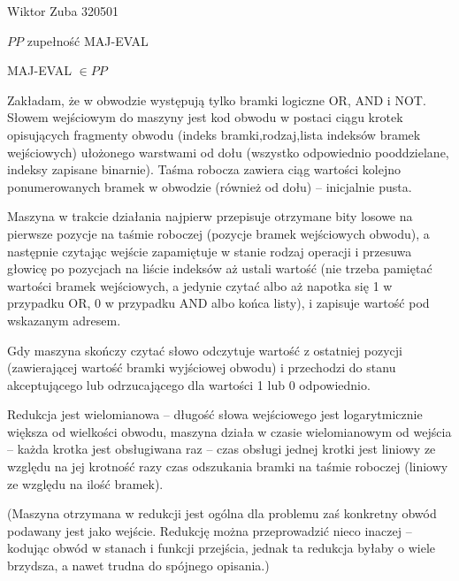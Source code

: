 \documentclass{article}
\begin{document}
Wiktor Zuba 320501\newline

$PP$ zupełność MAJ-EVAL\newline

MAJ-EVAL $\in PP$\newline

Zakładam, że w obwodzie występują tylko bramki logiczne OR, AND i NOT.\newline
Słowem wejściowym do maszyny jest kod obwodu w postaci ciągu krotek opisujących fragmenty obwodu
(indeks bramki,rodzaj,lista indeksów bramek wejściowych) ułożonego warstwami od dołu (wszystko odpowiednio pooddzielane, indeksy zapisane binarnie).\newline
Taśma robocza zawiera ciąg wartości kolejno ponumerowanych bramek w obwodzie (również od dołu) -- inicjalnie pusta.\newline

Maszyna w trakcie działania najpierw przepisuje otrzymane bity losowe na pierwsze pozycje na taśmie roboczej (pozycje bramek wejściowych obwodu),
a następnie czytając wejście zapamiętuje w stanie rodzaj operacji i przesuwa głowicę po pozycjach na liście indeksów aż ustali wartość
(nie trzeba pamiętać wartości bramek wejściowych, a jedynie czytać albo aż napotka się 1 w przypadku OR, 0 w przypadku AND albo końca listy),
i zapisuje wartość pod wskazanym adresem.

Gdy maszyna skończy czytać słowo odczytuje wartość z ostatniej pozycji
(zawierającej wartość bramki wyjściowej obwodu) i przechodzi do stanu akceptującego lub odrzucającego dla wartości 1 lub 0 odpowiednio.\newline

Redukcja jest wielomianowa -- długość słowa wejściowego jest logarytmicznie większa od wielkości obwodu,
maszyna działa w czasie wielomianowym od wejścia -- każda krotka jest obsługiwana raz --
czas obsługi jednej krotki jest liniowy ze względu na jej krotność razy czas odszukania bramki na taśmie roboczej (liniowy ze względu na ilość bramek).\newline

(Maszyna otrzymana w redukcji jest ogólna dla problemu zaś konkretny obwód podawany jest jako wejście. 
Redukcję można przeprowadzić nieco inaczej -- kodując obwód w stanach i funkcji przejścia,
jednak ta redukcja byłaby o wiele brzydsza, a nawet trudna do spójnego opisania.)\newline\newline\newline
\end{document}
